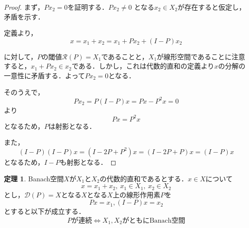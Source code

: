 \documentclass[11pt,a4paper,titlepage]{jsreport}
\theoremstyle{definition}
\newtheorem{thm}{定理}
\begin{document}
\begin{proof}
  まず，$P{x_2}=0$を証明する．$P{x_2} \neq 0$ となる$x_2 \in X_2$が存在すると仮定し，矛盾を示す．

  定義より，
  \begin{equation*}
    x = x_1 + x_2 = x_1 + P{x_2} + (I-P)x_2
  \end{equation*}

  に対して，$P$の閾値$\mathcal{R}(P)=X_1$であることと，$X_1$が線形空間であることに注意すると，$x_1+Px_2 \in x_2 $である．しかし，これは代数的直和の定義より$x$の分解の一意性に矛盾する．よって$P{x_2}=0$となる．

  そのうえで，
  \begin{equation*}
    Px_2 = P(I-P)x = Px - P^2x = 0
  \end{equation*}
  より
  \begin{equation*}
    Px = P^2x
  \end{equation*}
  となるため，$P$は射影となる．

  また，
  \begin{equation*}
    (I-P)(I-P)x = (I-2P+P^2)x = (I - 2P + P)x = (I-P)x
  \end{equation*}
  となるため，$I-P$も射影となる．
\end{proof}

\begin{thm}
  Banach空間$X$が$X_1$と$X_2$の代数的直和であるとする．$x \in X$について
  \begin{equation*}
    x = x_1 + x_2,\ x_1 \in X_1,\ x_2\in X_2
  \end{equation*}
  とし，$\mathcal{D}(P)=X$となる$X$となる$X$上の線形作用素$P$を
  \begin{equation*}
    Px = x_1, (I-P)x = x_2
  \end{equation*}
  とすると以下が成立する．
  \begin{equation*}
    Pが連続 \Leftrightarrow X_1, X_2 がともに\text{Banach}空間
  \end{equation*}
\end{thm}
\end{document}
